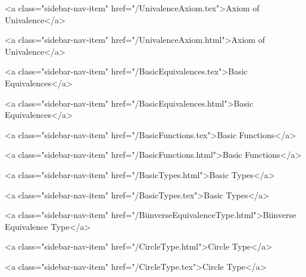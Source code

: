       
    
      
        
          <a class="sidebar-nav-item" href="/UnivalenceAxiom.tex">Axiom of Univalence</a>
        
      
    
      
        
          <a class="sidebar-nav-item" href="/UnivalenceAxiom.html">Axiom of Univalence</a>
        
      
    
      
        
          <a class="sidebar-nav-item" href="/BasicEquivalences.tex">Basic Equivalences</a>
        
      
    
      
        
          <a class="sidebar-nav-item" href="/BasicEquivalences.html">Basic Equivalences</a>
        
      
    
      
        
          <a class="sidebar-nav-item" href="/BasicFunctions.tex">Basic Functions</a>
        
      
    
      
        
          <a class="sidebar-nav-item" href="/BasicFunctions.html">Basic Functions</a>
        
      
    
      
        
          <a class="sidebar-nav-item" href="/BasicTypes.html">Basic Types</a>
        
      
    
      
        
          <a class="sidebar-nav-item" href="/BasicTypes.tex">Basic Types</a>
        
      
    
      
        
          <a class="sidebar-nav-item" href="/BiinverseEquivalenceType.html">Biinverse Equivalence Type</a>
        
      
    
      
        
          <a class="sidebar-nav-item" href="/CircleType.html">Circle Type</a>
        
      
    
      
        
          <a class="sidebar-nav-item" href="/CircleType.tex">Circle Type</a>
        
